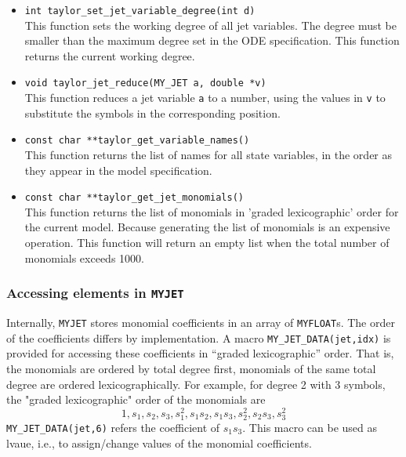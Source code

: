 \documentclass[10pt]{article}
\theoremstyle{remark}
\newcommand{\myfloat}{{\tt MY\symbol{95}FLOAT}}
\newcommand{\myjet}{{\tt MY\symbol{95}JET}}
\newcommand{\inputfiles}[1]{%
\ifthenelse{\equal{#1}{sec:ex0}}{{\tt lorenz1.eq}}{%
\ifthenelse{\equal{#1}{sec:ex1}}{{\tt lorenz1.eq}}{%
\ifthenelse{\equal{#1}{sec:ex_params}}{{\tt perturbation.eq}}{%
\ifthenelse{\equal{#1}{sec:ex_lyap}}{{\tt lorenz2.eq}}{%
\ifthenelse{\equal{#1}{sec:ex_varieq}}{{\tt lorenz3.eq}}{%
\ifthenelse{\equal{#1}{sec:ex5}}{{\tt lorenz4.eq}}{%
\ifthenelse{\equal{#1}{sec:ex_omp}}{{\tt lorenz4.eq}}{%
\ifthenelse{\equal{#1}{sec:ex_equilibria}}{{\tt lorenz5.eq}}{%
\ifthenelse{\equal{#1}{sec:ex_myjetaccess}}{{\tt model.eq}}{%
\ifthenelse{\equal{#1}{sec:ex_driving}}{{\tt lorenz1.eq}}{%
\ifthenelse{\equal{#1}{sec:ex_io_myjet}}{{\tt io\symbol{95}myjet.eq}}{%
ERROR!!!!!}}}}}}}}}}}%
}
\newcommand{\odecfiles}[1]{%
\ifthenelse{\equal{#1}{sec:ex0}}{{\tt lorenz1.c}}{%
\ifthenelse{\equal{#1}{sec:ex1}}{{\tt lorenz1.c}}{%
\ifthenelse{\equal{#1}{sec:ex_params}}{{\tt perturbation.c}}{%
\ifthenelse{\equal{#1}{sec:ex_lyap}}{{\tt lorenz2.c}}{%
\ifthenelse{\equal{#1}{sec:ex_varieq}}{{\tt lorenz3.c}}{%
\ifthenelse{\equal{#1}{sec:ex5}}{{\tt lorenz4.c}}{%
\ifthenelse{\equal{#1}{sec:ex_omp}}{{\tt lorenz4.c}}{%
\ifthenelse{\equal{#1}{sec:ex_equilibria}}{{\tt lorenz5.c}}{%
\ifthenelse{\equal{#1}{sec:ex_myjetaccess}}{{\tt jdata.c}}{%
\ifthenelse{\equal{#1}{sec:ex_driving}}{{\tt lorenz.c}}{%
\ifthenelse{\equal{#1}{sec:ex_io_myjet}}{{\tt io\symbol{95}myjet.c}}{%
ERROR!!!!!}}}}}}}}}}}%
}
\newcommand{\odehfiles}[1]{%
\ifthenelse{\equal{#1}{sec:ex0}}{{\tt taylor.h}}{%
\ifthenelse{\equal{#1}{sec:ex1}}{{\tt taylor.h}}{%
\ifthenelse{\equal{#1}{sec:ex_params}}{{\tt taylor.h}}{%
\ifthenelse{\equal{#1}{sec:ex_lyap}}{{\tt lorenz2.h}}{%
\ifthenelse{\equal{#1}{sec:ex_varieq}}{{\tt lorenz3.h}}{%
\ifthenelse{\equal{#1}{sec:ex5}}{{\tt lorenz4.h}}{%
\ifthenelse{\equal{#1}{sec:ex_omp}}{{\tt lorenz4.h}}{%
\ifthenelse{\equal{#1}{sec:ex_equilibria}}{{\tt lorenz5.h}}{%
\ifthenelse{\equal{#1}{sec:ex_myjetaccess}}{{\tt jdata.h}}{%
\ifthenelse{\equal{#1}{sec:ex_driving}}{{\tt taylor.h}}{%
\ifthenelse{\equal{#1}{sec:ex_io_myjet}}{{\tt io\symbol{95}myjet.h}}{%
ERROR!!!!!}}}}}}}}}}}%
}
\newcommand{\mainfiles}[1]{%
\ifthenelse{\equal{#1}{sec:ex0}}{{\tt main\symbol{95}lrnz.c}}{%
\ifthenelse{\equal{#1}{sec:ex1}}{{\tt main\symbol{95}lrnz.c}}{%
\ifthenelse{\equal{#1}{sec:ex_params}}{{\tt main\symbol{95}params.c}}{%
\ifthenelse{\equal{#1}{sec:ex_lyap}}{{\tt main\symbol{95}lyap.c}}{%
\ifthenelse{\equal{#1}{sec:ex_varieq}}{{\tt main\symbol{95}varieq.c}}{%
\ifthenelse{\equal{#1}{sec:ex5}}{{\tt main4.c}}{%
\ifthenelse{\equal{#1}{sec:ex_omp}}{{\tt main\symbol{95}omp.c}}{%
\ifthenelse{\equal{#1}{sec:ex_equilibria}}{{\tt main\symbol{95}equilibria.c}}{%
\ifthenelse{\equal{#1}{sec:ex_myjetaccess}}{{\tt jdata\symbol{95}main.c}}{%
\ifthenelse{\equal{#1}{sec:ex_io_myjet}}{{\tt io\symbol{95}main.c}}{%
ERROR!!!!!}}}}}}}}}}%
}
\newcommand{\inputfile}{}
\newcommand{\mainfile}{}
\newcommand{\odecfile}{}
\newcommand{\odehfile}{}
\begin{document}
\begin{itemize}
\item{\verb+int taylor_set_jet_variable_degree(int d)+\\
    This function sets the working degree of all jet variables.  The
    degree must be smaller than the maximum degree set in the ODE
    specification.  This function returns the current working degree.}
    
\item{\verb+void taylor_jet_reduce(MY_JET a, double *v)+\\
    This function reduces a jet variable \verb+a+ to a number, using
    the values in \verb+v+ to substitute the symbols in the
    corresponding position.}
    
\item{\verb+const char **taylor_get_variable_names()+\\
    This function returns the list of names for all state variables,
    in the order as they appear in the model specification.}
    
\item{\verb+const char **taylor_get_jet_monomials()+\\
    This function returns the list of monomials in 'graded
    lexicographic' order for the current model. Because generating the
    list of monomials is an expensive operation. This function will
    return an empty list when the total number of monomials exceeds
    1000.}
\end{itemize}


\subsubsection*{Accessing elements in \myjet{}} \label{sec:ex_myjetaccess}
\renewcommand{\inputfile}{\inputfiles{sec:ex_myjetaccess}}
\renewcommand{\odecfile}{\odecfiles{sec:ex_myjetaccess}}
\renewcommand{\odehfile}{\odehfiles{sec:ex_myjetaccess}}
\renewcommand{\mainfile}{\mainfiles{sec:ex_myjetaccess}}

Internally, \myjet{} stores monomial coefficients in an array of
\myfloat{}s. The order of the coefficients differs by
implementation. A macro \verb+MY_JET_DATA(jet,idx)+ is provided for
accessing these coefficients in ``graded lexicographic'' order.  That
is, the monomials are ordered by total degree first, monomials of the
same total degree are ordered lexicographically.  For example, for
degree 2 with 3 symbols, the "graded lexicographic" order of the
monomials are
\[
1, s_1, s_2, s_3, s_1^2, s_1s_2, s_1s_3, s_2^2, s_2s_3, s_3^2
\]
\verb+MY_JET_DATA(jet,6)+ refers the coefficient of $s_1s_3$.  This
macro can be used as lvaue, i.e., to assign/change values of the
monomial coefficients.
\end{document}
